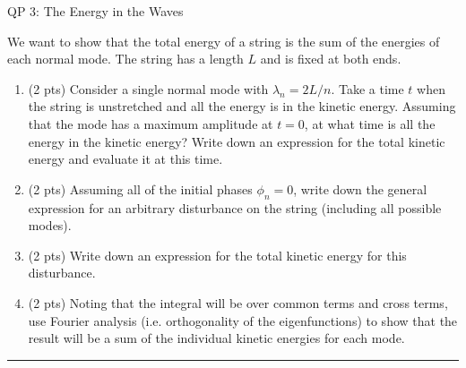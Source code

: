 \documentclass[12pt]{article}
\begin{document}
%
\begin{centering}
\LARGE{QP 3: The Energy in the Waves}
\end{centering}
\bigskip
\bigskip

We want to show that the total energy of a string is the sum of the energies of each normal mode. The string has a length $L$ and is fixed at both ends.

\begin{enumerate}[label=(\alph*)]
\item (2 pts)
Consider a single normal mode with $\lambda_n = 2 L/n$. Take a time $t$ when the string is unstretched and all the energy is in the kinetic energy. Assuming that the mode has a maximum amplitude at $t = 0$, at what time is all the energy in the kinetic energy? Write down an expression for the total kinetic energy and evaluate it at this time.

\item (2 pts)
Assuming all of the initial phases $\phi_n = 0$, write down the general expression for an arbitrary disturbance on the string (including all possible modes).

\item (2 pts)
Write down an expression for the total kinetic energy for this disturbance.

\item (2 pts)
Noting that the integral will be over common terms and cross terms, use Fourier analysis (i.e. orthogonality of the eigenfunctions) to show that the result will be a sum of the individual kinetic energies for each mode.

\end{enumerate}
\bigskip
{\color{Sepia} \hrule}



\end{document}

